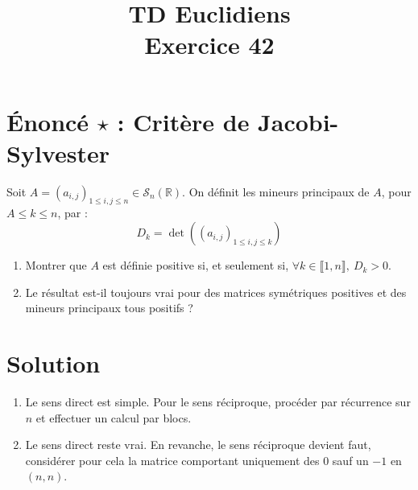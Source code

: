 \documentclass[french]{article}
\title{TD Euclidiens\\ Exercice 42}
\date{}
\newcommand{\R}{\mathbb{R}}
\begin{document}
\maketitle

\section{Énoncé $\star$ : Critère de Jacobi-Sylvester}
Soit $A=(a_{i,j})_{1\leqslant i,j\leqslant n}\in\mathcal{S}_n(\R)$. On définit les mineurs principaux de $A$, pour $A\leqslant k\leqslant n$, par : $$D_k=\det((a_{i,j})_{1\leqslant i,j\leqslant k})$$
\begin{enumerate}
	\item Montrer que $A$ est définie positive si, et seulement si, $\forall k\in\llbracket1,n\rrbracket,\ D_k>0$.
	\item Le résultat est-il toujours vrai pour des matrices symétriques positives et des mineurs principaux tous positifs ?
\end{enumerate}
\section{Solution}
\begin{enumerate}
	\item Le sens direct est simple. Pour le sens réciproque, procéder par récurrence sur $n$ et effectuer un calcul par blocs.
	\item Le sens direct reste vrai. En revanche, le sens réciproque devient faut, considérer pour cela la matrice comportant uniquement des $0$ sauf un $-1$ en $(n,n)$.
\end{enumerate}
\end{document}
